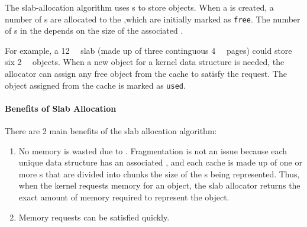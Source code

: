 The slab-allocation algorithm uses s to store  objects.
When a  is created, a number of s are allocated to the ,which are initially marked as \texttt{free}.
The number of s in the  depends on the size of the associated .

For example, a \SI{12}{\kibi{} \byte{}} slab (made up of three continguous \SI{4}{\kibi{} \byte{}} pages) could store six \SI{2}{\kibi{} \byte{}} objects.
When a new object for a kernel data structure is needed, the allocator can assign any free object from the cache to satisfy the request.
The object assigned from the cache is marked as \texttt{used}.

\paragraph{Benefits of Slab Allocation}\label{subsubsec:Slab_Allocation_Benefits}
There are 2 main benefits of the slab allocation algorithm:
\begin{enumerate}[noitemsep]
\item No memory is wasted due to .
  Fragmentation is not an issue because each unique  data structure has an associated , and each cache is made up of one or more s that are divided into chunks the size of the s being represented.
  Thus, when the kernel requests memory for an object, the slab allocator returns the exact amount of memory required to represent the object.
\item Memory requests can be satisfied quickly.
\end{enumerate}

